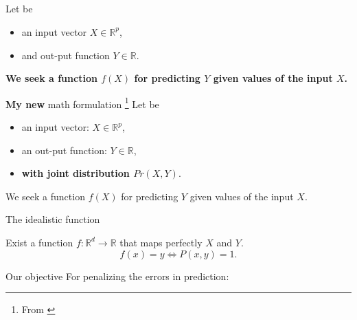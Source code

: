 \subsection{\subsectiontitle}
\begin{frame}{\subsectiontitle}
    Let be
    \begin{itemize}
        \item an input vector $X \in \mathbb{R}^p$, 
        \item and out-put function $Y \in \mathbb{R}$.
    \end{itemize}
    
    \textbf{ 
      We seek a function $f(X)$ for predicting $Y$ given values of the input $X$.
      }
\end{frame}
\begin{frame}{\textbf{My new} math formulation \footnote{ From \cite{HastieStatisticalLearing}}}
    Let be
    \begin{itemize}
        \item an input vector: $X \in \mathbb{R}^p$, 
        \item an out-put function: $Y \in \mathbb{R}$,
        \item  \textbf{with joint distribution $Pr(X,Y)$}.
    \end{itemize}
    
      We seek a function $f(X)$ for predicting $Y$ given values of the input $X$.

      \pause 
      \begin{theorem}{The idealistic function}
        
      \end{theorem}  
      Exist a function $f: \mathbb{R}^d \longrightarrow \mathbb{R}$ that maps perfectly $X$ and $Y$. 
      \begin{equation}
        f(x) = y 
        \Longleftrightarrow
        P(x,y) = 1.
      \end{equation}
\end{frame}
\begin{frame}{Our objective}
    For penalizing the errors in prediction: 

    
\end{frame}